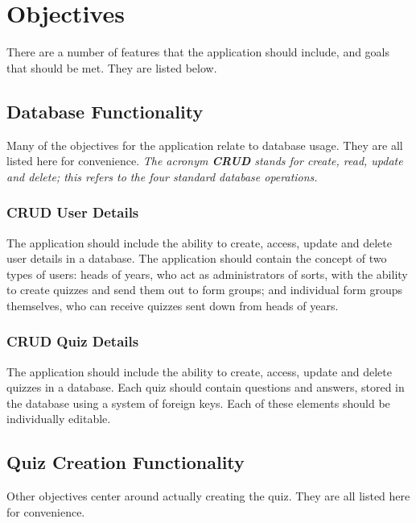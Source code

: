 \section{Objectives}
There are a number of features that the application should include, and goals that should be met. They are listed below.

\subsection{Database Functionality}
Many of the objectives for the application relate to database usage. They are all listed here for convenience. \textit{The acronym \textbf{CRUD} stands for create, read, update and delete; this refers to the four standard database operations.}

\subsubsection{CRUD User Details}
The application should include the ability to create, access, update and delete user details in a database. The application should contain the concept of two types of users: heads of years, who act as administrators of sorts, with the ability to create quizzes and send them out to form groups; and individual form groups themselves, who can receive quizzes sent down from heads of years.

\subsubsection{CRUD Quiz Details}
The application should include the ability to create, access, update and delete quizzes in a database. Each quiz should contain questions and answers, stored in the database using a system of foreign keys. Each of these elements should be individually editable.

\subsection{Quiz Creation Functionality}
Other objectives center around actually creating the quiz. They are all listed here for convenience.

